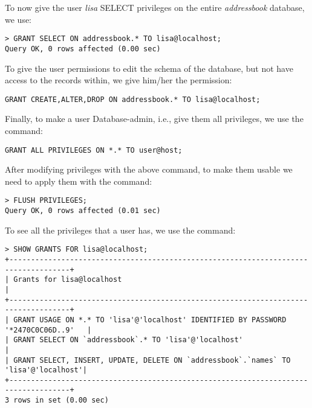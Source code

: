 \noindent
To now give the user \textit{lisa} SELECT privileges on the entire \textit{addressbook} database, we use:

\vspace{-15pt}
\begin{verbatim}
> GRANT SELECT ON addressbook.* TO lisa@localhost;
Query OK, 0 rows affected (0.00 sec)
\end{verbatim}
\vspace{-10pt}	

\noindent
To give the user permissions to edit the schema of the database, but not have access to the records within, we give him/her the permission:

\vspace{-15pt}
\begin{verbatim}
GRANT CREATE,ALTER,DROP ON addressbook.* TO lisa@localhost;
\end{verbatim}
\vspace{-10pt}	

\noindent
Finally, to make a user Database-admin, i.e., give them all privileges, we use the command:

\vspace{-15pt}
\begin{verbatim}
GRANT ALL PRIVILEGES ON *.* TO user@host;
\end{verbatim}
\vspace{-10pt}	

\noindent
After modifying privileges with the above command, to make them usable we need to apply them with the command:

\vspace{-15pt}
\begin{verbatim}
> FLUSH PRIVILEGES;
Query OK, 0 rows affected (0.01 sec)
\end{verbatim}
\vspace{-10pt}	

\noindent
To see all the privileges that a user has, we use the command:

\vspace{-15pt}
\begin{verbatim}
> SHOW GRANTS FOR lisa@localhost;
+------------------------------------------------------------------------------------+
| Grants for lisa@localhost                                                          |
+------------------------------------------------------------------------------------+
| GRANT USAGE ON *.* TO 'lisa'@'localhost' IDENTIFIED BY PASSWORD '*2470C0C06D..9'   |
| GRANT SELECT ON `addressbook`.* TO 'lisa'@'localhost'                              |
| GRANT SELECT, INSERT, UPDATE, DELETE ON `addressbook`.`names` TO 'lisa'@'localhost'|
+------------------------------------------------------------------------------------+
3 rows in set (0.00 sec)
\end{verbatim}
\vspace{-10pt}	

